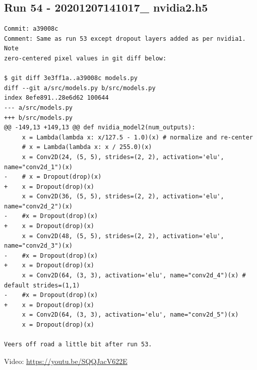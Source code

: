 \subsection{Run 54 - 20201207141017\_ nvidia2.h5}
\begin{verbatim}
Commit: a39008c
Comment: Same as run 53 except dropout layers added as per nvidia1. Note
zero-centered pixel values in git diff below:

$ git diff 3e3ff1a..a39008c models.py
diff --git a/src/models.py b/src/models.py
index 8efe891..28e6d62 100644
--- a/src/models.py
+++ b/src/models.py
@@ -149,13 +149,13 @@ def nvidia_model2(num_outputs):
     x = Lambda(lambda x: x/127.5 - 1.0)(x) # normalize and re-center
     # x = Lambda(lambda x: x / 255.0)(x)
     x = Conv2D(24, (5, 5), strides=(2, 2), activation='elu', name="conv2d_1")(x)
-    # x = Dropout(drop)(x)
+    x = Dropout(drop)(x)
     x = Conv2D(36, (5, 5), strides=(2, 2), activation='elu', name="conv2d_2")(x)
-    #x = Dropout(drop)(x)
+    x = Dropout(drop)(x)
     x = Conv2D(48, (5, 5), strides=(2, 2), activation='elu', name="conv2d_3")(x)
-    #x = Dropout(drop)(x)
+    x = Dropout(drop)(x)
     x = Conv2D(64, (3, 3), activation='elu', name="conv2d_4")(x) # default strides=(1,1)
-    #x = Dropout(drop)(x)
+    x = Dropout(drop)(x)
     x = Conv2D(64, (3, 3), activation='elu', name="conv2d_5")(x)
     x = Dropout(drop)(x)

Veers off road a little bit after run 53.
\end{verbatim}
Video: \url{https://youtu.be/SQQJacV622E}

